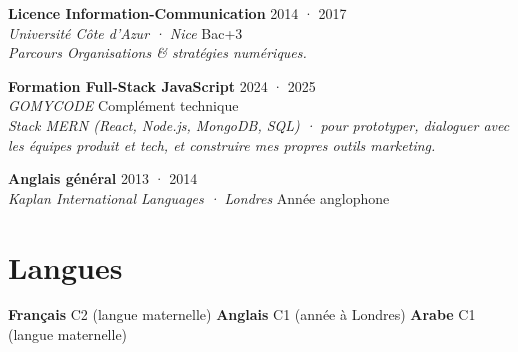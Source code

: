 \documentclass[a4paper,10pt]{article}
\newcommand{\expheader}[4]{%
  \textbf{\color{brown}#1} \hfill \color{greydark}\footnotesize #2 \\[-1pt]
  \textit{\color{greydark}\small #3} \hfill \color{greymid}\footnotesize #4 \\[2pt]
}
\begin{document}
\vspace{4pt}
\expheader{Licence Information-Communication}{2014 · 2017}{Université Côte d'Azur · Nice}{Bac+3}
\textit{Parcours Organisations \& stratégies numériques.}

\vspace{4pt}
\expheader{Formation Full-Stack JavaScript}{2024 · 2025}{GOMYCODE}{Complément technique}
\textit{Stack MERN (React, Node.js, MongoDB, SQL) · pour prototyper, dialoguer avec les équipes produit et tech, et construire mes propres outils marketing.}

\vspace{4pt}
\expheader{Anglais général}{2013 · 2014}{Kaplan International Languages · Londres}{Année anglophone}

\section{Langues}

\textbf{\color{brown}Français} C2 (langue maternelle) \quad\textbullet\quad
\textbf{\color{brown}Anglais} C1 (année à Londres) \quad\textbullet\quad
\textbf{\color{brown}Arabe} C1 (langue maternelle)
\end{document}
